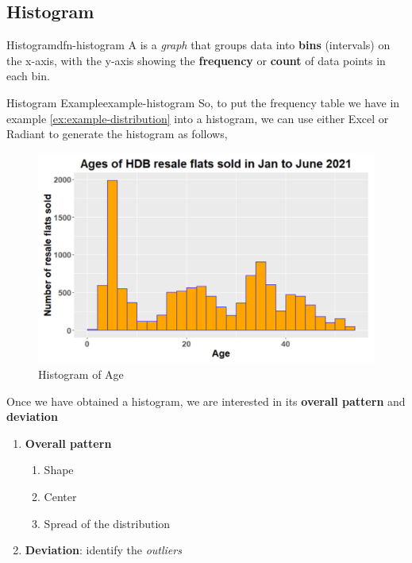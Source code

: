 \documentclass[math,code]{amznotes}
\theoremstyle{remark}
\begin{document}
\subsection{Histogram}
\begin{dfnbox}{Histogram}{dfn-histogram}
    A \textbf{\color{red}{histogram}} is a \textit{graph} that groups data into \textbf{bins} (intervals) on the x-axis, with the y-axis showing the \textbf{frequency} or \textbf{count} of data points in each bin.
\end{dfnbox}
\begin{exbox}{Histogram Example}{example-histogram}
    So, to put the frequency table we have in example \ref{ex:example-distribution} into a histogram, we can use either Excel or Radiant to generate the histogram as follows,
    \begin{figure}[H]
        \centering
        \includegraphics[width=0.6\linewidth]{images/chapter3-histogram-example.png}
        \caption{Histogram of Age}
        \label{fig:chapter3-histogram-example}
    \end{figure}
\end{exbox}
Once we have obtained a histogram, we are interested in its \textbf{overall pattern} and \textbf{deviation}
\begin{enumerate}
    \item \textbf{Overall pattern}
    \begin{enumerate}
        \item Shape
        \item Center
        \item Spread of the distribution
    \end{enumerate}
    \item \textbf{Deviation}: identify the \textit{outliers}
\end{enumerate}
\end{document}
